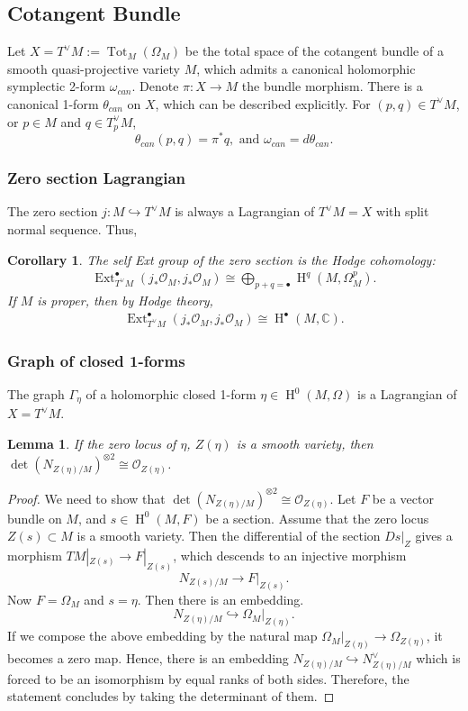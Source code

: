 \documentclass[12pt]{amsart}
\newtheorem{lemma}[theorem]{Lemma}
\newtheorem{corollary}[theorem]{Corollary}
\theoremstyle{definition}
\theoremstyle{remark}
\numberwithin{equation}{section}
\newcommand{\CC}{\mathbb{C}}
\newcommand{\shO}{\mathcal{O}}
\newcommand{\Ext}{\operatorname{Ext}}
\newcommand{\Tot}{\operatorname{Tot}}
\newcommand{\arw}{\longrightarrow}
\newcommand{\Hdot}{\operatorname{H}}
\begin{document}
%
\subsection{Cotangent Bundle}
    Let $X=T^{\vee}M:=\Tot_M(\Omega_M)$ be the total space of the cotangent bundle of a smooth quasi-projective variety $M$, which admits a canonical holomorphic symplectic 2-form $\omega_{can}$. Denote $\pi: X\arw M$ the bundle morphism. There is a canonical 1-form $\theta_{can}$ on $X$, which can be described explicitly. For $(p, q)\in T^{\vee}M$, or $p\in M$ and $q\in T^{\vee}_pM$,
    $$\theta_{can}(p, q)=\pi^{*}q, \,\,\text{and  } \omega_{can}=d\theta_{can}.$$ 
\subsubsection{Zero section Lagrangian} The zero section $j: M\hookrightarrow T^{\vee}M$ is always a Lagrangian of $T^{\vee}M=X$ with split normal sequence. Thus,
    \begin{corollary}\label{cor: Ext}
    The self Ext group of the zero section is the Hodge cohomology: 
       \begin{align}\label{Ext=Hodge}
    \Ext_{T^{\vee}M}^{\bullet}(j_*\shO_M, j_*\shO_M)\cong \bigoplus_{p+q=\bullet} \Hdot^q(M, \Omega_M^p).
\end{align}
If $M$ is proper, then by Hodge theory,
\begin{align}\label{Ext=DR}
    \Ext_{T^{\vee}M}^{\bullet}(j_*\shO_M, j_*\shO_M)\cong \Hdot^{\bullet}(M, \CC).
\end{align} 
    \end{corollary}

\subsubsection{Graph of closed 1-forms} The graph $\Gamma_{\eta}$ of a holomorphic closed 1-form $\eta\in \Hdot^0(M, \Omega)$ is a Lagrangian of $X=T^{\vee}M$.  
\begin{lemma}\label{lem: graph}
   If the zero locus of $\eta$, $Z(\eta)$ is a smooth variety, then $\det(N_{Z(\eta)/M})^{\otimes 2}\cong \shO_{Z(\eta)}$.  
\end{lemma}
 \begin{proof}
 We need to show that $\det(N_{Z(\eta)/M})^{\otimes 2}\cong \shO_{Z(\eta)}$. 
     Let $F$ be a vector bundle on $M$, and $s\in \Hdot^0(M, F)$ be a section. Assume that the zero locus $Z(s)\subset M$ is a smooth variety. Then the differential of the section $Ds|_Z$ gives a morphism $TM|_{Z(s)}\arw F|_{Z(s)}$, which descends to an injective morphism $$N_{Z(s)/M}\arw F|_{Z(s)}.$$
     Now $F=\Omega_M$ and $s=\eta$. Then there is an embedding.  
$$N_{Z(\eta)/M}\hookrightarrow \Omega_M|_{Z(\eta)}.$$
If we compose the above embedding by the natural map $\Omega_M|_{Z(\eta)}\arw \Omega_{Z(\eta)}$, it becomes a zero map. Hence, there is an embedding $N_{Z(\eta)/M}\hookrightarrow N_{Z(\eta)/M}^{\vee} $ which is forced to be an isomorphism by equal ranks of both sides. Therefore, the statement concludes by taking the determinant of them.
 \end{proof}
\end{document}
